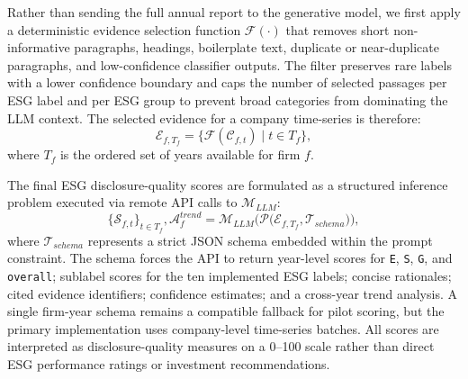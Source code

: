 \documentclass{article}
\theoremstyle{plain}
\theoremstyle{definition}
\theoremstyle{remark}
\begin{document}
Rather than sending the full annual report to the generative model, we first apply a deterministic evidence selection function $\mathcal{F}(\cdot)$ that removes short non-informative paragraphs, headings, boilerplate text, duplicate or near-duplicate paragraphs, and low-confidence classifier outputs. The filter preserves rare labels with a lower confidence boundary and caps the number of selected passages per ESG label and per ESG group to prevent broad categories from dominating the LLM context. The selected evidence for a company time-series is therefore:
\begin{equation}
    \mathcal{E}_{f,T_f} = \{\mathcal{F}(\mathcal{C}_{f,t}) \mid t \in T_f\},
    \label{eq:evidence_filter}
\end{equation}
where $T_f$ is the ordered set of years available for firm $f$.

The final ESG disclosure-quality scores are formulated as a structured inference problem executed via remote API calls to $\mathcal{M}_{LLM}$:
\begin{equation}
    \{\mathcal{S}_{f,t}\}_{t \in T_f}, \mathcal{A}^{trend}_{f}
    =
    \mathcal{M}_{LLM}\Big(\mathcal{P}\big(\mathcal{E}_{f,T_f}, \mathcal{T}_{schema}\big)\Big),
    \label{eq:llm_api}
\end{equation}
where $\mathcal{T}_{schema}$ represents a strict JSON schema embedded within the prompt constraint. The schema forces the API to return year-level scores for \texttt{E}, \texttt{S}, \texttt{G}, and \texttt{overall}; sublabel scores for the ten implemented ESG labels; concise rationales; cited evidence identifiers; confidence estimates; and a cross-year trend analysis. A single firm-year schema remains a compatible fallback for pilot scoring, but the primary implementation uses company-level time-series batches. All scores are interpreted as disclosure-quality measures on a 0--100 scale rather than direct ESG performance ratings or investment recommendations.
\end{document}
